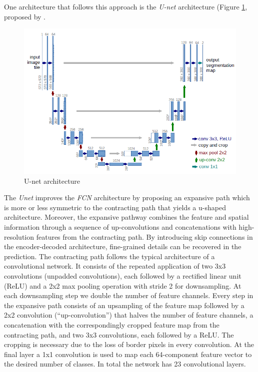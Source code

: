 One architecture that follows this approach is the \textit{U-net} architecture (Figure \ref{fig:unet_architecture}, proposed by \citep{ronneberger2015u}.
\begin{figure}
\centerline{\includegraphics[scale=0.6]{images/chapter_2/unet.png}}
\caption{U-net architecture \citep{ronneberger2015u}}
\label{fig:unet_architecture}
\end{figure}
The \textit{Unet} improves the \textit{FCN} architecture by proposing an expansive path which is more or less symmetric to the contracting path that yields a u-shaped architecture. Moreover, the expansive pathway combines the feature and spatial information through a sequence of up-convolutions and concatenations with high-resolution features from the contracting path. By introducing skip connections in the encoder-decoded architecture, fine-grained details can be recovered in the prediction. The contracting path follows the typical architecture of a convolutional network. It consists of the repeated application of two 3x3 convolutions (unpadded convolutions), each followed by a rectified linear unit (ReLU) and a 2x2 max pooling operation with stride 2 for downsampling. At each downsampling step we double the number of feature channels. Every step in the expansive path consists of an upsampling of the feature map followed by a 2x2 convolution (“up-convolution”) that halves the number of feature channels, a concatenation with the correspondingly cropped feature map from the contracting path, and two 3x3 convolutions, each followed by a ReLU. The cropping is necessary due to the loss of border pixels in every convolution. At the final layer a 1x1 convolution is used to map each 64-component feature vector to the desired number of classes. In total the network has 23 convolutional layers.

